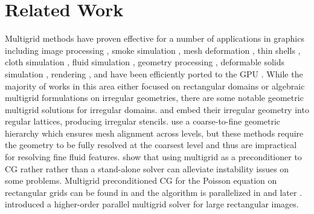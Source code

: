 \section{Related Work}
Multigrid methods have proven effective for a number of applications in graphics including image processing \cite{KH08,BWK06,RC03}, smoke simulation \cite{MCPN08}, mesh deformation \cite{SYBF06}, thin shells \cite{green:2002:subdivision}, cloth simulation \cite{Oh:2008:APF}, fluid simulation \cite{CNF07,CTG10}, geometry processing \cite{ni:2004:multigrid}, deformable solids simulation \cite{OGR07}, rendering \cite{Stam95multiplescattering,HMB05}, and have been efficiently ported to the GPU \cite{BFGS03,goodnight:2003:multigrid,GSMMWBT08}. While the majority of works in this area either focused on rectangular domains or algebraic multigrid formulations on irregular geometries, there are some notable geometric multigrid solutions for irregular domains. \cite{HMB05} and \cite{CLB09} embed their irregular geometry into regular lattices, producing irregular stencils. \cite{RC03,Oh:2008:APF} use a coarse-to-fine geometric hierarchy which ensures mesh alignment across levels, but these methods require the geometry to be fully resolved at the coarsest level and thus are impractical for resolving fine fluid features.   \cite{SAB99} show that using multigrid as a preconditioner to CG rather rather than a stand-alone solver can alleviate instability issues on some problems.  Multigrid preconditioned CG for the Poisson equation on rectangular grids can be found in \cite{T93} and the algorithm is parallelized in \cite{TO94} and later \cite{AF96}.  \cite{KH08} introduced a higher-order parallel multigrid solver for large rectangular images. 
% 
